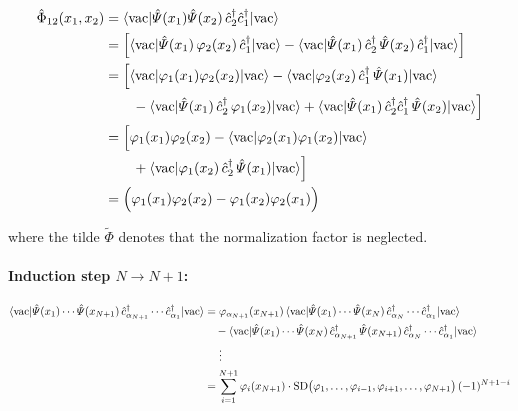 \begin{align}
\hat{\Phi}_{12}(x_1,x_2)
&= \langle\mathrm{vac}|\hat\varPsi(x_1)\hat\varPsi(x_2)\,\hat c_2^\dagger\hat c_1^\dagger|\mathrm{vac}\rangle\\
&= \Big[\langle\mathrm{vac}|\hat\varPsi(x_1)\,\varphi_2(x_2)\,\hat c_1^\dagger|\mathrm{vac}\rangle
- \langle\mathrm{vac}|\hat\varPsi(x_1)\,\hat c_2^\dagger\,\hat\varPsi(x_2)\,\hat c_1^\dagger|\mathrm{vac}\rangle\Big]\\
&= \Big[\langle\mathrm{vac}|\varphi_1(x_1)\varphi_2(x_2)|\mathrm{vac}\rangle - \langle\mathrm{vac}|\varphi_2(x_2)\,\hat c_1^\dagger\,\hat\varPsi(x_1)|\mathrm{vac}\rangle\notag\\
&\qquad - \langle\mathrm{vac}|\hat\varPsi(x_1)\,\hat c_2^\dagger\,\varphi_1(x_2)|\mathrm{vac}\rangle + \langle\mathrm{vac}|\hat\varPsi(x_1)\,\hat c_2^\dagger\hat c_1^\dagger\,\hat\varPsi(x_2)|\mathrm{vac}\rangle\Big]\\
&= \Big[\varphi_1(x_1)\varphi_2(x_2) - \langle\mathrm{vac}|\varphi_2(x_1)\varphi_1(x_2)|\mathrm{vac}\rangle\notag\\
&\qquad + \langle\mathrm{vac}|\varphi_1(x_2)\,\hat c_2^\dagger\,\hat\varPsi(x_1)|\mathrm{vac}\rangle\Big]\\
&= \Big(\varphi_1(x_1)\varphi_2(x_2) - \varphi_1(x_2)\varphi_2(x_1)\Big)
\end{align}

where the tilde $\tilde{\Phi}$ denotes that the normalization factor is neglected.

\paragraph{Induction step $N\to N+1$:}
\begin{align}
\langle\mathrm{vac}|\hat\varPsi(x_1)\cdots\hat\varPsi(x_{N+1})\,\hat c_{\alpha_{N+1}}^\dagger\cdots\hat c_{\alpha_1}^\dagger|\mathrm{vac}\rangle
&= \varphi_{\alpha_{N+1}}(x_{N+1})\,\langle\mathrm{vac}|\hat\varPsi(x_1)\cdots\hat\varPsi(x_N)\,\hat c_{\alpha_N}^\dagger\cdots\hat c_{\alpha_1}^\dagger|\mathrm{vac}\rangle\notag\\
&\quad - \langle\mathrm{vac}|\hat\varPsi(x_1)\cdots\hat\varPsi(x_N)\,\hat c_{\alpha_{N+1}}^\dagger\,\hat\varPsi(x_{N+1})\,\hat c_{\alpha_N}^\dagger\cdots\hat c_{\alpha_1}^\dagger|\mathrm{vac}\rangle\notag\\
&\quad\ \vdots\notag\\
&= \sum_{i=1}^{N+1}\varphi_i(x_{N+1})\cdot \mathrm{SD}\big(\varphi_1,\dots,\varphi_{i-1},\varphi_{i+1},\dots,\varphi_{N+1}\big)\,(-1)^{N+1-i}
\end{align}

